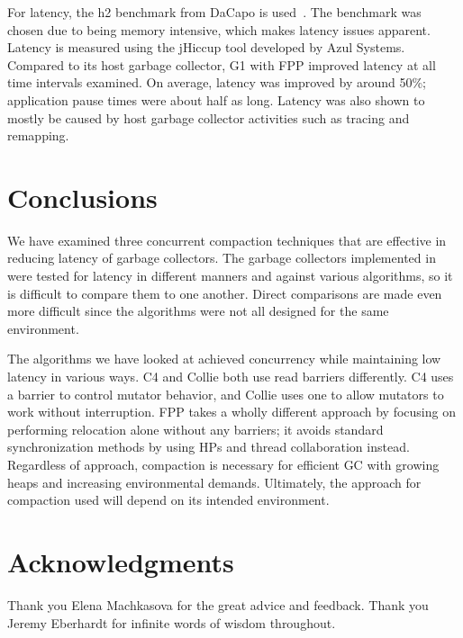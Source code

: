 \documentclass{sig-alternate}
\begin{document}
For latency, the h2 benchmark from DaCapo is used~\cite{Blackburn:DaCapo}.
The benchmark was chosen due to being memory intensive,
which makes latency issues apparent.
Latency is measured using the jHiccup tool developed by Azul Systems.
Compared to its host garbage collector, G1 with FPP improved latency at all time
intervals examined. On average, latency was improved by around 50\%; application
pause times were about half as long. Latency was also shown to mostly be caused by 
host garbage collector activities such as tracing and remapping.


\section{Conclusions}
\label{sec:conclusions}

We have examined three concurrent compaction techniques that are 
effective in reducing latency of garbage collectors.
The garbage collectors implemented in were tested for latency in
different manners and against various algorithms, so it is difficult to 
compare them to one another. Direct comparisons are made even more difficult since the
algorithms were not all designed for the same environment.

The algorithms we have looked at achieved concurrency while maintaining low latency in various
ways. C4 and Collie both use read barriers differently. C4 
uses a barrier to control mutator behavior, and Collie uses one to allow mutators to
work without interruption. FPP takes a wholly different approach by focusing on 
performing relocation alone without any barriers; it avoids standard synchronization methods by using HPs
and thread collaboration instead.
Regardless of approach, compaction is necessary for efficient GC with growing heaps and
increasing environmental demands. Ultimately,
the approach for compaction used will depend on its intended environment.



\section*{Acknowledgments}
\label{sec:acknowledgments}


Thank you Elena Machkasova for the great advice and feedback.
Thank you Jeremy Eberhardt for infinite words of wisdom throughout.



  
\end{document}
